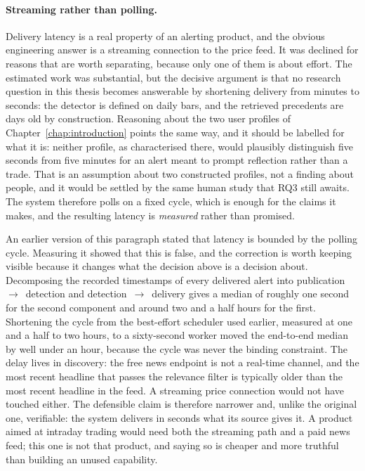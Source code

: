 \paragraph{Streaming rather than polling.} Delivery latency is a real property of an alerting product,
and the obvious engineering answer is a streaming connection to the price feed. It was declined for
reasons that are worth separating, because only one of them is about effort. The estimated work was
substantial, but the decisive argument is that no research question in this thesis becomes answerable
by shortening delivery from minutes to seconds: the detector is defined on daily bars, and the
retrieved precedents are days old by construction. Reasoning about the two user profiles of
Chapter~\ref{chap:introduction} points the same way, and it should be labelled for what it is: neither
profile, as characterised there, would plausibly distinguish five seconds from five minutes for an alert
meant to prompt reflection rather than a trade. That is an assumption about two constructed profiles,
not a finding about people, and it would be settled by the same human study that RQ3 still awaits. The
system therefore polls on a fixed cycle, which is enough for the claims it makes, and the resulting
latency is \emph{measured} rather than promised.

An earlier version of this paragraph stated that latency is bounded by the polling cycle. Measuring it
showed that this is false, and the correction is worth keeping visible because it changes what the
decision above is a decision about. Decomposing the recorded timestamps of every delivered alert into
publication~$\rightarrow$~detection and detection~$\rightarrow$~delivery gives a median of roughly one
second for the second component and around two and a half hours for the first. Shortening the cycle
from the best-effort scheduler used earlier, measured at one and a half to two hours, to a sixty-second
worker moved the end-to-end median by well under an hour, because the cycle was never the binding
constraint. The delay lives in discovery: the free news endpoint is not a real-time channel, and the
most recent headline that passes the relevance filter is typically older than the most recent headline
in the feed. A streaming price connection would not have touched either. The defensible claim is
therefore narrower and, unlike the original one, verifiable: the system delivers in seconds what its
source gives it. A product aimed at intraday trading would need both the streaming path and a paid news
feed; this one is not that product, and saying so is cheaper and more truthful than building an unused
capability.

